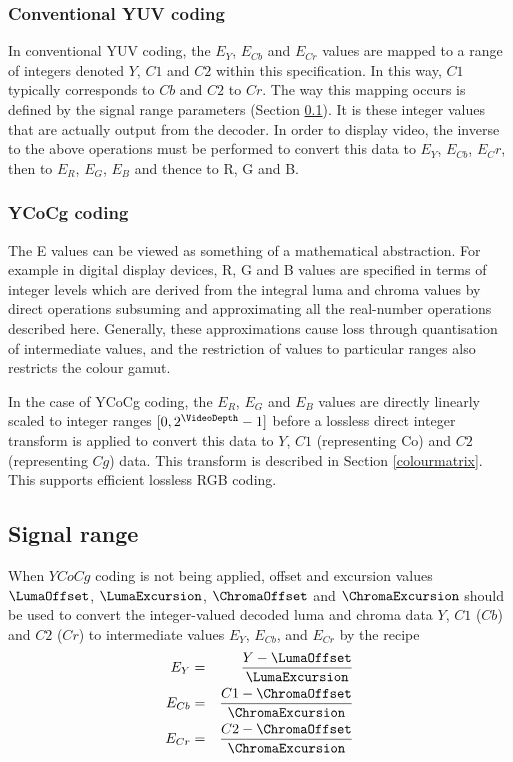 \begin{informative*}
\subsubsection{Conventional YUV coding}
In conventional YUV coding, the $E_Y$, $E_{Cb}$ and $E_{Cr}$ values are
mapped to a range of integers denoted $Y$, $C1$ and $C2$ within this
specification. In this way, $C1$ typically corresponds to $Cb$ and
$C2$ to $Cr$. The way this mapping occurs is defined by the signal
range parameters (Section \ref{signalranges}). It is these integer values 
that are actually output from the decoder. In order to display video, the inverse to the above
operations must be performed to convert this data to $E_Y$, $E_{Cb}$, $E_Cr$, then
to $E_R$, $E_G$, $E_B$ and thence to R, G and B.  

\subsubsection{YCoCg coding}
The E values can be viewed as something of a mathematical abstraction.
For example in digital display devices, R, G and B values are specified
in terms of integer levels which are derived from the integral luma and
chroma values by direct operations subsuming and approximating all the
real-number operations described here. Generally, these approximations
cause loss through quantisation of intermediate values, and the
restriction of values to particular ranges also restricts the colour
gamut. 

In the case of YCoCg coding, the $E_R$, $E_G$ and $E_B$ values are directly
linearly scaled to integer ranges $[0,2^\VideoDepth-1]$ before a lossless 
direct integer transform is applied to convert this data to $Y$, $C1$ (representing
Co) and $C2$ (representing $Cg$) data. This transform is described in Section
\ref{colourmatrix}. This supports efficient lossless RGB coding.

\subsection{Signal range}
\label{signalranges}

When $YCoCg$ coding is not being applied, offset and excursion values 
$\LumaOffset$, $\LumaExcursion$, $\ChromaOffset$ and
$\ChromaExcursion$ should be used to convert the
integer-valued decoded luma and chroma data $Y$, $C1$ ($Cb$) and $C2$ ($Cr$) 
to intermediate values $E_Y$, $E_{Cb}$, and $E_{Cr}$ by the recipe
\begin{eqnarray*}
E_Y & = & \dfrac{Y-\LumaOffset}{\LumaExcursion} \\
E_{Cb} & = & \dfrac{C1-\ChromaOffset}{\ChromaExcursion} \\
E_{Cr} & = & \dfrac{C2-\ChromaOffset}{\ChromaExcursion}
\end{eqnarray*}


\end{informative*}
